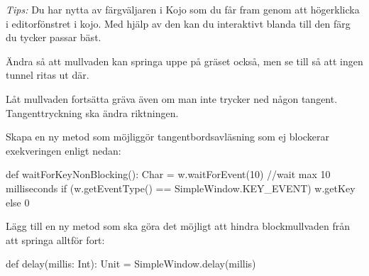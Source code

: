 \emph{Tips:} Du har nytta av färgväljaren i Kojo som du får fram genom att högerklicka i editorfönstret i kojo. Med hjälp av den kan du interaktivt blanda till den färg du tycker passar bäst.

\Task
Ändra så att mullvaden kan springa uppe på gräset också, men se till så att ingen tunnel ritas ut där.


\Task
Låt mullvaden fortsätta gräva även om man inte trycker ned någon tangent. Tangenttryckning ska ändra riktningen.

\Subtask
Skapa en ny metod  som möjliggör tangentbordsavläsning som ej blockerar exekveringen enligt nedan:

\begin{Code}
  def waitForKeyNonBlocking(): Char  = {
    w.waitForEvent(10) //wait max 10 milliseconds
    if (w.getEventType() == SimpleWindow.KEY_EVENT) w.getKey else 0
  }
\end{Code}

\Subtask
Lägg till en ny metod  som ska göra det möjligt att hindra blockmullvaden från att springa alltför fort:
\begin{Code}
def delay(millis: Int): Unit = SimpleWindow.delay(millis)
\end{Code}


